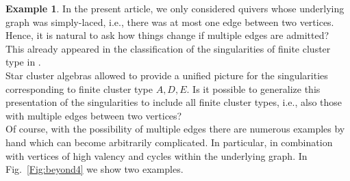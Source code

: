 \documentclass[letter,11pt]{amsart}
\theoremstyle{theorem}
\theoremstyle{definition}
\newtheorem{example}[Thm]{Example}
\numberwithin{equation}{section}
\begin{document}
\begin{example}
	\label{Ex.4}
	In the present article, we only considered quivers whose underlying graph was simply-laced,
	i.e., there was at most one edge between two vertices.
	Hence, it is natural to ask how things change if multiple edges are admitted? 
	This already appeared in the classification of the singularities of finite cluster type in \cite{BFMS23,BFMS25}.  
	\\
	Star cluster algebras allowed to provide a unified picture for the singularities corresponding to finite cluster type $ A, D, E $.
	Is it possible to generalize this presentation of the singularities  to include all finite cluster types, i.e., also those with multiple edges between two vertices? 
	\\
	Of course, with the possibility of multiple edges there are numerous examples by hand which can become arbitrarily complicated. 
	In particular, in combination with vertices of high valency and cycles within the underlying graph. 
	In Fig.~\ref{Fig:beyond4} we show two examples.
		
	\begin{figure}[h!] 
\end{figure}
\end{example}
\end{document}
